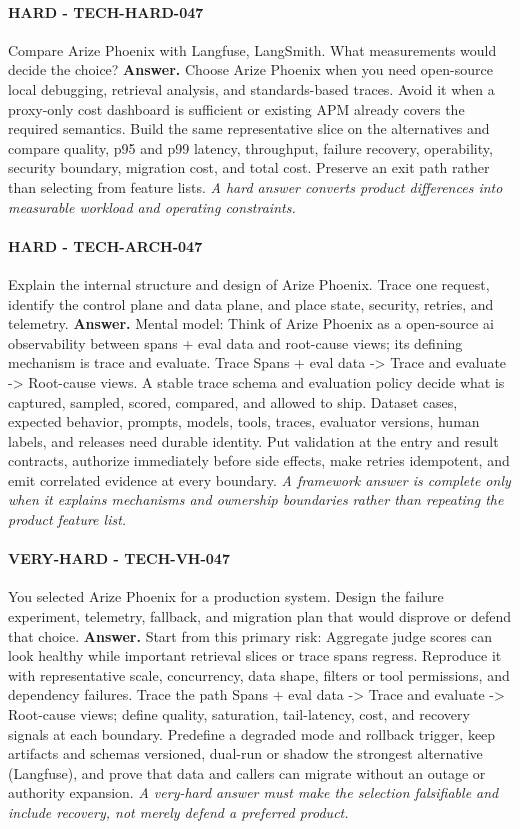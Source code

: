 \paragraph{HARD - TECH-HARD-047} Compare Arize Phoenix with Langfuse, LangSmith. What measurements would decide the choice?
\textbf{Answer.} Choose Arize Phoenix when you need open-source local debugging, retrieval analysis, and standards-based traces. Avoid it when a proxy-only cost dashboard is sufficient or existing APM already covers the required semantics. Build the same representative slice on the alternatives and compare quality, p95 and p99 latency, throughput, failure recovery, operability, security boundary, migration cost, and total cost. Preserve an exit path rather than selecting from feature lists.
\textit{A hard answer converts product differences into measurable workload and operating constraints.}
\paragraph{HARD - TECH-ARCH-047} Explain the internal structure and design of Arize Phoenix. Trace one request, identify the control plane and data plane, and place state, security, retries, and telemetry.
\textbf{Answer.} Mental model: Think of Arize Phoenix as a open-source ai observability between spans + eval data and root-cause views; its defining mechanism is trace and evaluate. Trace Spans + eval data -> Trace and evaluate -> Root-cause views. A stable trace schema and evaluation policy decide what is captured, sampled, scored, compared, and allowed to ship. Dataset cases, expected behavior, prompts, models, tools, traces, evaluator versions, human labels, and releases need durable identity. Put validation at the entry and result contracts, authorize immediately before side effects, make retries idempotent, and emit correlated evidence at every boundary.
\textit{A framework answer is complete only when it explains mechanisms and ownership boundaries rather than repeating the product feature list.}
\paragraph{VERY-HARD - TECH-VH-047} You selected Arize Phoenix for a production system. Design the failure experiment, telemetry, fallback, and migration plan that would disprove or defend that choice.
\textbf{Answer.} Start from this primary risk: Aggregate judge scores can look healthy while important retrieval slices or trace spans regress. Reproduce it with representative scale, concurrency, data shape, filters or tool permissions, and dependency failures. Trace the path Spans + eval data -> Trace and evaluate -> Root-cause views; define quality, saturation, tail-latency, cost, and recovery signals at each boundary. Predefine a degraded mode and rollback trigger, keep artifacts and schemas versioned, dual-run or shadow the strongest alternative (Langfuse), and prove that data and callers can migrate without an outage or authority expansion.
\textit{A very-hard answer must make the selection falsifiable and include recovery, not merely defend a preferred product.}
